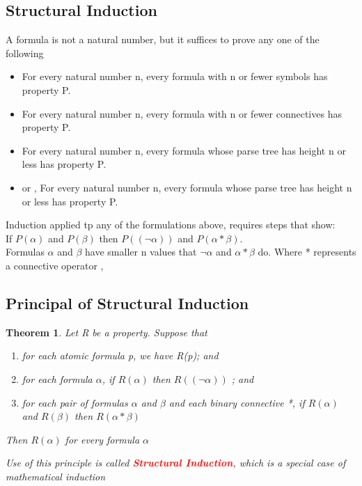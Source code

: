 \documentclass{article}
\newcounter{lecnum}
\newtheorem{theorem}{Theorem}[lecnum]
\begin{document}
\subsection{Structural Induction}

A formula is not a natural number, but it suffices to prove any one of the following

\begin{itemize}
\item For every natural number n, every formula with n or fewer
symbols has property P.
\item For every natural number n, every formula with n or fewer
connectives has property P.
\item For every natural number n, every formula whose parse tree
has height n or less has property P.
\item or , For every natural number n, every formula whose parse tree
has height n or less has property P.
\end{itemize}

Induction applied tp any of the formulations above, requires steps that show: \\
If \(P(\alpha)\) and \(P(\beta)\) then \(P((\neg \alpha))\) and \(P(\alpha * \beta)\). \\  

Formulas \(\alpha\) and \(\beta\) have smaller n values that \(\neg \alpha\) and \(\alpha * \beta\) do. Where * represents a connective operator , 

\subsection{Principal of Structural Induction}
\begin{theorem}
Let R be a property. Suppose that 
\begin{enumerate}
\item for each atomic formula p, we have R(p); and
\item for each formula \(\alpha\), if \(R(\alpha)\)  then \(R((\neg \alpha))\) ; and 
\item for each pair of formulas \(\alpha\) and \(\beta\) and each binary connective *, if \(R(\alpha)\) and \(R(\beta)\) then \(R(\alpha * \beta)\) 
\end{enumerate}

Then \(R(\alpha)\) for every formula \(\alpha\) 

Use of this principle is called \textbf{\textcolor{red}{Structural Induction}}, which is a special case of mathematical induction
\end{theorem}  
\end{document}
